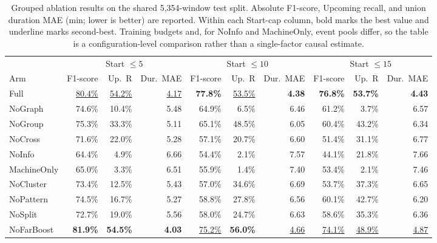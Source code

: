 \documentclass[a4paper,fleqn]{cas-dc}
\begin{document}
\begin{table}[htbp]
\centering
\caption{Grouped ablation results on the shared 5,354-window test split. Absolute F1-score, Upcoming recall, and union duration MAE (min; lower is better) are reported. Within each Start-cap column, bold marks the best value and underline marks second-best. Training budgets and, for NoInfo and MachineOnly, event pools differ, so the table is a configuration-level comparison rather than a single-factor causal estimate.}
\label{tab:ablation-grouped}
\scriptsize
\setlength{\tabcolsep}{3.0pt}
\renewcommand{\arraystretch}{1.05}
\begin{tabular*}{\textwidth}{@{\extracolsep{\fill}}lrrr|rrr|rrr@{}}
\toprule
& \multicolumn{3}{c|}{Start $\leq5$} & \multicolumn{3}{c|}{Start $\leq10$} & \multicolumn{3}{c}{Start $\leq15$} \\
Arm & F1-score & Up.\ R & Dur.\ MAE & F1-score & Up.\ R & Dur.\ MAE & F1-score & Up.\ R & Dur.\ MAE \\
\midrule
Full & \underline{80.4\%} & \underline{54.2\%} & \underline{4.17} & \textbf{77.8\%} & \underline{53.5\%} & \textbf{4.38} & \textbf{76.8\%} & \textbf{53.7\%} & \textbf{4.43} \\
\midrule
NoGraph & 74.6\% & 10.4\% & 5.48 & 64.9\% & 6.5\% & 6.46 & 61.2\% & 3.7\% & 6.57 \\
NoGroup & 75.3\% & 33.3\% & 5.11 & 65.1\% & 48.5\% & 6.05 & 60.4\% & 43.2\% & 6.34 \\
NoCross & 71.6\% & 22.0\% & 5.28 & 57.1\% & 20.7\% & 6.60 & 51.4\% & 31.1\% & 6.77 \\
NoInfo & 64.4\% & 4.9\% & 6.66 & 54.4\% & 2.1\% & 7.57 & 44.1\% & 21.8\% & 7.66 \\
MachineOnly & 65.0\% & 3.3\% & 6.51 & 55.9\% & 1.4\% & 7.40 & 53.4\% & 2.1\% & 7.46 \\
\midrule
NoCluster & 73.4\% & 12.5\% & 5.43 & 57.0\% & 34.6\% & 6.69 & 53.7\% & 37.3\% & 6.65 \\
\midrule
NoPattern & 74.5\% & 16.7\% & 5.27 & 58.8\% & 27.8\% & 6.56 & 60.1\% & 42.7\% & 6.20 \\
NoSplit & 72.7\% & 19.0\% & 5.56 & 58.0\% & 24.7\% & 6.63 & 58.6\% & 35.3\% & 6.36 \\
NoFarBoost & \textbf{81.9\%} & \textbf{54.5\%} & \textbf{4.03} & \underline{75.2\%} & \textbf{56.0\%} & \underline{4.66} & \underline{74.1\%} & \underline{48.9\%} & \underline{4.87} \\
\bottomrule
\end{tabular*}
\end{table}
\end{document}
